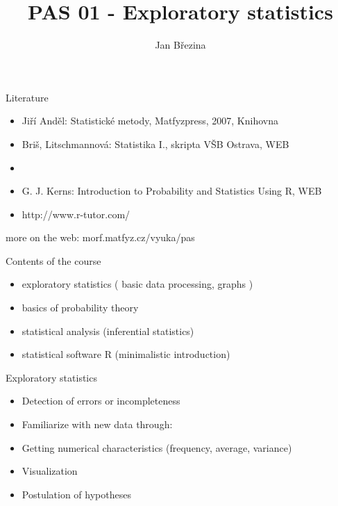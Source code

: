 \documentclass[smaller, hyperref={colorlinks=true}]{beamer}
\title{PAS 01 - Exploratory statistics}
\author{Jan B\v rezina}
\institute %
{
  Technical University of Liberec
}
\begin{document}
\begin{frame}
  \titlepage
\end{frame}


\begin{frame}{Literature} 
\begin{itemize}
 \item Jiří Anděl: Statistické metody, Matfyzpress, 2007, Knihovna
 \item Briš, Litschmannová: Statistika I., skripta VŠB Ostrava, WEB
 \item 
 \item G. J. Kerns: Introduction to Probability and Statistics Using R, WEB
 \item http://www.r-tutor.com/
\end{itemize}
more on the web: morf.matfyz.cz/vyuka/pas
\end{frame}

\begin{frame}{Contents of the course}
 \begin{itemize}
  \item exploratory statistics ( basic data processing, graphs )
  \item basics of probability theory 
  \item statistical analysis (inferential statistics)
  \item statistical software R (minimalistic introduction)
 \end{itemize}
\end{frame}

\begin{frame}{Exploratory statistics}
\begin{itemize}
 \item Detection of errors or incompleteness
 \item Familiarize with new data through:
 \item Getting numerical characteristics (frequency, average, variance)
 \item Visualization
 \item Postulation of hypotheses
\end{itemize}
 
\end{frame}
\end{document}
